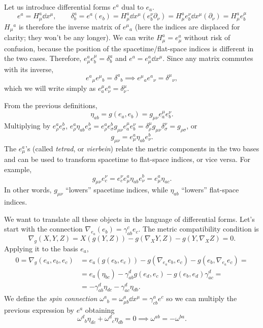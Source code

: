 \documentclass[a4paper,12pt]{book}
\begin{document}
Let us introduce differential forms $e^a$ dual to $e_a$.
\[e^a=H_\mu^a\dd x^\mu,\qquad \delta^a_b=e^a(e_b)=H_\mu^a\dd x^\mu(e_b^\nu\partial_\nu)=H_\mu^ae_b^\nu\dd x^\mu(\partial_\nu)=H_\mu^ae_b^\mu\]
$H_\mu{}^a$ is therefore the inverse matrix of $e^\mu{}_a$ (here the indices are displaced for clarity; they won't be any longer). We can write $H_\mu^a=e_\mu^a$ without risk of confusion, because the position of the spacetime/flat-space indices is different in the two cases. Therefore, $e^a_\mu e^\mu_b=\delta^a_b$ and $e^a=e^a_\mu\dd x^\mu$. Since any matrix commutes with its inverse,
\[e^a{}_\mu e^\mu{}_b=\delta^a{}_b\implies e^\mu{}_ae^a{}_\nu=\delta^\mu{}_\nu,\]
which we will write simply as $e^\mu_ae^a_\nu=\delta^\mu_\nu$.

From the previous definitions,
\[\eta_{ab}=g(e_a,e_b)=g_{\mu\nu}e^\mu_ae^\nu_b.\]
Multiplying by $e^a_\rho e^b_\sigma$, $e^a_\rho \eta_{ab} e^b_\sigma=e^a_\rho e^b_\sigma g_{\mu\nu}e^\mu_ae^\nu_b=\delta^\mu_\rho g_{\mu\nu}\delta^\nu_\sigma=g_{\rho\sigma}$, or
\[g_{\mu\nu}=e^a_\mu\eta_{ab}e^b_\nu.\]
The $e^a_\mu$'s (called \emph{tetrad}, or \emph{vierbein}) relate the metric components in the two bases and can be used to transform spacetime to flat-space indices, or vice versa. For example,
\[g_{\mu\nu}e^\nu_c=e^\nu_ce^a_\mu\eta_{ab}e^b_\nu=e^a_\mu\eta_{ac}.\]
In other words, $g_{\mu\nu}$ ``lowers'' spacetime indices, while $\eta_{ab}$ ``lowers'' flat-space indices.

We want to translate all these objects in the language of differential forms. Let's start with the connection
$\nabla_{e_a}(e_b)=\gamma_{ab}^ce_c$. The metric compatibility condition is
\[\nabla_g(X,Y,Z)=X(g(Y,Z))-g(\nabla_XY,Z)-g(Y,\nabla_XZ)=0.\]
Applying it to the basis $e_a$,
\begin{align*}
0=\nabla_g(e_a,e_b,e_c)&=e_a(g(e_b,e_c))-g(\nabla_{e_a}e_b,e_c)-g(e_b,\nabla_{e_a}e_c)=\\
&=e_a(\eta_{bc})-\gamma_{ab}^dg(e_d,e_c)-g(e_b,e_d)\gamma_{ac}^d=\\
&=-\gamma_{ab}^d\eta_{dc}-\gamma_{ac}^d\eta_{db}.
\end{align*}
We define the \emph{spin connection} $\omega^a{}_b=\omega^a_{\mu b}\dd x^\mu=\gamma_{cb}^ae^c$ so we can multiply the previous expression by $e^a$ obtaining
\[\omega^d{}_b\eta_{dc}+\omega^d{}_c\eta_{db}=0\implies \omega^{ab}=-\omega^{ba}.\]
\end{document}
